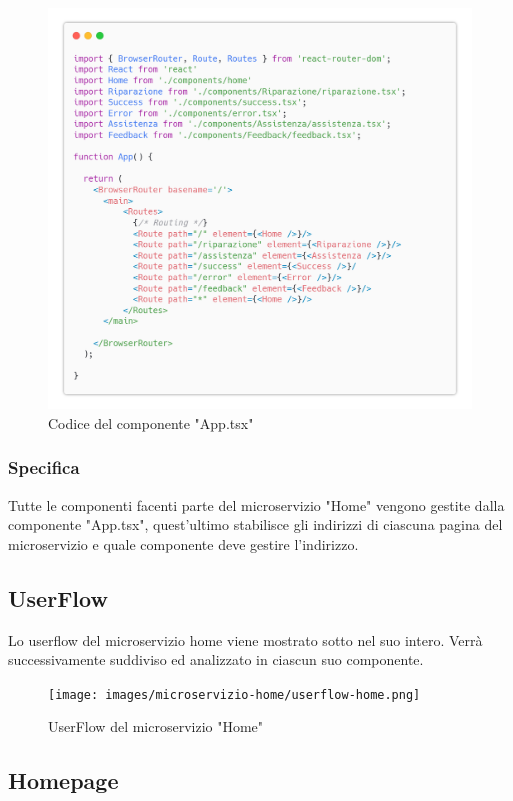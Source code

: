 \documentclass{report}
\begin{document}
\begin{figure}[H]
	\centering\includegraphics[width=1\textwidth]{images/microservizio-home/frontend/app-carbon.png}
	Codice del componente "App.tsx"
\end{figure}
\subsubsection*{Specifica}
Tutte le componenti facenti parte del microservizio "Home" vengono gestite dalla componente "App.tsx", quest'ultimo stabilisce gli indirizzi di ciascuna pagina del microservizio e quale componente deve gestire l'indirizzo. 

\subsection{UserFlow}
Lo userflow del microservizio home viene mostrato sotto nel suo intero. Verrà successivamente suddiviso ed analizzato in ciascun suo componente.
\begin{figure}[H]
	\centering\texttt{[image: images/microservizio-home/userflow-home.png]}
	\caption{UserFlow del microservizio "Home"}
\end{figure}


\subsection{Homepage}
\end{document}
